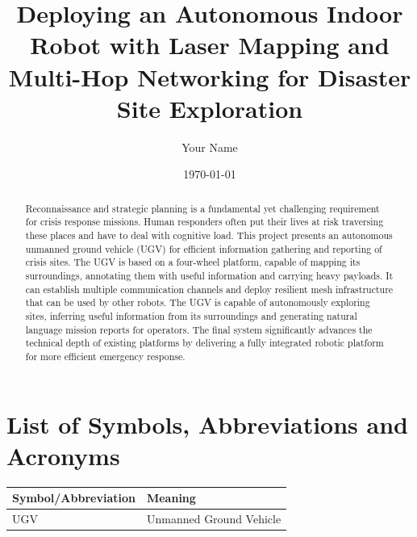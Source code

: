 \documentclass[12pt,a4paper]{report}
\title{Deploying an Autonomous Indoor Robot with Laser Mapping and Multi-Hop Networking for Disaster Site Exploration}
\author{Your Name}
\date{\today}
\begin{document}
\maketitle

\begin{abstract}
Reconnaissance and strategic planning is a fundamental yet challenging requirement for crisis response missions. Human responders often put their lives at risk traversing these places and have to deal with cognitive load. This project presents an autonomous unmanned ground vehicle (UGV) for efficient information gathering and reporting of crisis sites. The UGV is based on a four-wheel platform, capable of mapping its surroundings, annotating them with useful information and carrying heavy payloads. It can establish multiple communication channels and deploy resilient mesh infrastructure that can be used by other robots. The UGV is capable of autonomously exploring sites, inferring useful information from its surroundings and generating natural language mission reports for operators. The final system significantly advances the technical depth of existing platforms by delivering a fully integrated robotic platform for more efficient emergency response.
\end{abstract}

\tableofcontents

\chapter*{List of Symbols, Abbreviations and Acronyms}
\begin{tabular}{@{}ll@{}}
\toprule
\textbf{Symbol/Abbreviation} & \textbf{Meaning} \\
\midrule
UGV & Unmanned Ground Vehicle \\
\bottomrule
\end{tabular}

\listoffigures
\listoftables





\end{document}
